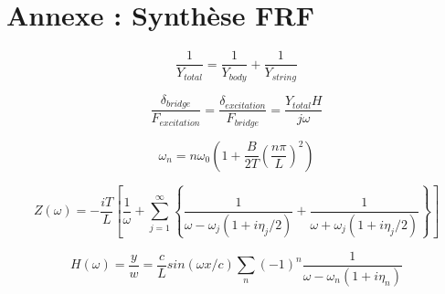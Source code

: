 \newpage
\section*{Annexe : Synthèse FRF}

\begin{equation}
  \frac{1}{Y_{total}} = \frac{1}{Y_{body}} + \frac{1}{Y_{string}}
  \label{eq:eq_frf_1}
\end{equation}

\begin{equation}
  \frac{\delta_{bridge}}{F_{excitation}} = \frac{\delta_{excitation}}{F_{bridge}} = \frac{Y_{total}H}{j\omega}
  \label{eq:eq_frf_2}
\end{equation}

\begin{equation}
	\omega_n = n\omega_0\left(1+\frac{B}{2T}(\frac{n\pi}{L})^2\right)
 \label{eq:eq_frf_3}
\end{equation}


\begin{equation}
 Z(\omega) = -\frac{iT}{L} \left[ \frac{1}{\omega} + \sum_{j=1}^{\infty} \left\lbrace \frac{1}{\omega - \omega_j (1+ i\eta_j/2)} + \frac{1}{\omega + \omega_j (1+ i\eta_j/2)} \right\rbrace  \right]
  \label{eq:eq_frf_4}
\end{equation}

\begin{equation}
H(\omega) = \frac{y}{w} = \frac{c}{L} sin(\omega x/c )\sum_n (-1)^n \frac{1}{\omega - \omega_n(1 + i\eta_n)}
  \label{eq:eq_frf_5}
\end{equation}


